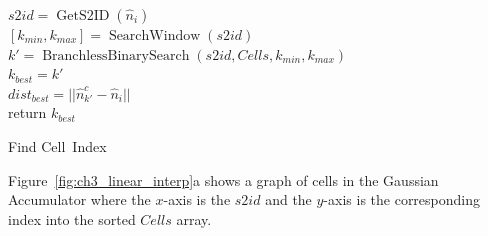 \begin{algorithm}[ht]
    \SetStartEndCondition{ }{}{}%

    
    $s2id = \operatorname{GetS2ID}(\hat{n}_i)$ \\
    $[k_{min}, k_{max}] = \operatorname{SearchWindow}(s2id) $\\
    $k' = \operatorname{BranchlessBinarySearch}(s2id, Cells, k_{min}, k_{max})$\\
    $k_{best} = k'$\\
    $dist_{best} = ||\hat{n}^c_{k'}-\hat{n}_i  ||$ \\
    return $k_{best}$
    \caption{Find Cell~Index}
    \label{alg:ch3_find_cell_index}
\end{algorithm}
Figure~\ref{fig:ch3_linear_interp}a shows a graph of cells in the Gaussian Accumulator where the $x$-axis is the $s2id$ and the $y$-axis is the corresponding index into the sorted $Cells$ array. %
